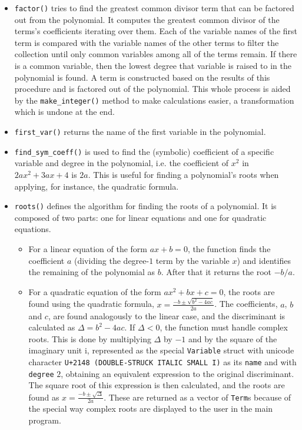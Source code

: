 \begin{itemize}
    \item \verb|factor()| tries to find the greatest common divisor term that can be factored out from the polynomial. It computes the greatest common divisor of the terms's coefficients iterating over them. Each of the variable names of the first term is compared with the variable names of the other terms to filter the collection until only common variables among all of the terms remain. If there is a common variable, then the lowest degree that variable is raised to in the polynomial is found. A term is constructed based on the results of this procedure and is factored out of the polynomial. This whole process is aided by the \verb|make_integer()| method to make calculations easier, a transformation which is undone at the end.
    \item \verb|first_var()| returns the name of the first variable in the polynomial.
    \item \verb|find_sym_coeff()| is used to find the (symbolic) coefficient of a specific variable and degree in the polynomial, i.e. the coefficient of $x^2$ in $2ax^2 + 3ax + 4$ is $2a$. This is useful for finding a polynomial's roots when applying, for instance, the quadratic formula.
    \item \verb|roots()| defines the algorithm for finding the roots of a polynomial. It is composed of two parts: one for linear equations and one for quadratic equations.
    \begin{itemize}
        \item For a linear equation of the form $ax + b = 0$, the function finds the coefficient $a$ (dividing the degree-$1$ term by the variable $x$) and identifies the remaining of the polynomial as $b$. After that it returns the root $-b/a$.
        \item For a quadratic equation of the form $ax^2 + bx + c = 0$, the roots are found using the quadratic formula, $x = \frac{-b \pm \sqrt{b^2 - 4ac}}{2a}$. The coefficients, $a$, $b$ and $c$, are found analogously to the linear case, and the discriminant is calculated as $\Delta = b^2 - 4ac$. If $\Delta < 0$, the function must handle complex roots. This is done by multiplying $\Delta$ by $-1$ and by the square of the imaginary unit $\mathrm{i}$, represented as the special \verb|Variable| struct with unicode character \verb|U+2148 (DOUBLE-STRUCK ITALIC SMALL I)| as its \verb|name| and with \verb|degree| $2$, obtaining an equivalent expression to the original discriminant. The square root of this expression is then calculated, and the roots are found as $x = \frac{-b \pm \sqrt{\Delta}}{2a}$. These are returned as a vector of \verb|Term|s because of the special way complex roots are displayed to the user in the main program.  %
    \end{itemize}
\end{itemize}

